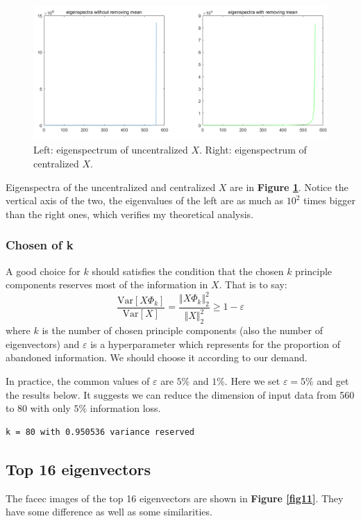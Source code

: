 \documentclass{article}
\begin{document}
\begin{figure}[H]
	\centering
	\includegraphics[scale=0.5]{figure10}
	\caption{Left: eigenspectrum of uncentralized $X$. Right: eigenspectrum of centralized $X$.}
	\label{fig10}
\end{figure}

Eigenspectra of the uncentralized and centralized $X$ are in \textbf{Figure \ref{fig10}}. Notice the vertical axis of the two, the eigenvalues of the left are as much as $10^2$ times bigger than the right ones, which verifies my theoretical analysis.

\subsubsection{Chosen of k}
A good choice for $k$ should satisfies the condition that the chosen $k$ principle components reserves most of the information in $X$. That is to say:
\[
\frac{\mathrm{Var}[X\Phi_k]}{\mathrm{Var}[X]}=\frac{\Vert X\Phi_k\Vert_2^2}{\Vert X\Vert_2^2}\ge 1-\varepsilon
\]
where $k$ is the number of chosen principle components (also the number of eigenvectors) and $\varepsilon$ is a hyperparameter which represents for the proportion of abandoned information. We should choose it according to our demand.\par
In practice, the common values of $\varepsilon$ are $5\%$ and $1\%$. Here we set $\varepsilon=5\%$ and get the results below. It suggests we can reduce the dimension of input data from 560 to 80 with only $5\%$ information loss.

\begin{commandline}
	\begin{verbatim}
k = 80 with 0.950536 variance reserved
	\end{verbatim}
\end{commandline}

\subsection{Top 16 eigenvectors}
The facec images of the top 16 eigenvectors are shown in \textbf{Figure \ref{fig11}}. They have some difference as well as some similarities.
\end{document}

